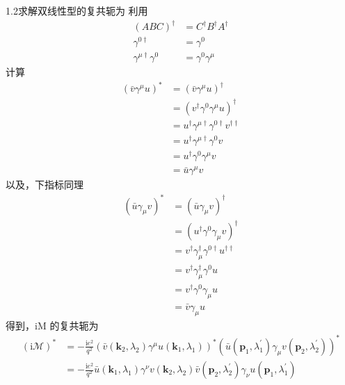 1.2求解双线性型的复共轭为
利用
\begin{equation}
    \begin{aligned}
        \left( ABC \right) ^{\dagger}&=C^{\dagger}B^{\dagger}A^{\dagger}
\\
\gamma ^{0\dagger}&=\gamma ^0
\\
\gamma ^{\mu \dagger}\gamma ^0&=\gamma ^0\gamma ^{\mu}
    \end{aligned}
\end{equation}
计算
\begin{equation}
    \begin{aligned}
       \left( \bar{v}\gamma ^{\mu}u \right) ^*&=\left( \bar{v}\gamma ^{\mu}u \right) ^{\dagger}
\\
&=\left( v^{\dagger}\gamma ^0\gamma ^{\mu}u \right) ^{\dagger}
\\
&=u^{\dagger}\gamma ^{\mu \dagger}\gamma ^{0\dagger}v^{\dagger \dagger}
\\
&=u^{\dagger}\gamma ^{\mu \dagger}\gamma ^0v
\\
&=u^{\dagger}\gamma ^0\gamma ^{\mu}v
\\
&=\bar{u}\gamma ^{\mu}v
    \end{aligned}
\end{equation}
以及，下指标同理
\begin{equation}
    \begin{aligned}
        \left( \bar{u}\gamma _{\mu}v \right) ^*&=\left( \bar{u}\gamma _{\mu}v \right) ^{\dagger}
\\
&=\left( u^{\dagger}\gamma ^0\gamma _{\mu}v \right) ^{\dagger}
\\
&=v^{\dagger}\gamma _{\mu}^{\dagger}\gamma ^{0\dagger}u^{\dagger \dagger}
\\
&=v^{\dagger}\gamma _{\mu}^{\dagger}\gamma ^0u
\\
&=v^{\dagger}\gamma ^0\gamma _{\mu}u
\\
&=\bar{v}\gamma _{\mu}u
    \end{aligned}
\end{equation}
得到，iM 的复共轭为
\begin{equation}
    \begin{aligned}
        \left( \mathrm{i}\mathcal{M} \right) ^*&=-\frac{\mathrm{i}e^2}{q^2}\left( \bar{v}(\mathbf{k}_2,\lambda _2)\gamma ^{\mu}u(\mathbf{k}_1,\lambda _1) \right) ^*\left( \bar{u}(\mathbf{p}_1,\lambda _{1}^{\prime})\gamma _{\mu}v(\mathbf{p}_2,\lambda _{2}^{\prime}) \right) ^*
\\
&=-\frac{\mathrm{i}e^2}{q^2}\bar{u}(\mathbf{k}_1,\lambda _1)\gamma ^{\nu}v(\mathbf{k}_2,\lambda _2)\bar{v}(\mathbf{p}_2,\lambda _{2}^{\prime})\gamma _{\nu}u(\mathbf{p}_1,\lambda _{1}^{\prime})
    \end{aligned}
\end{equation}

